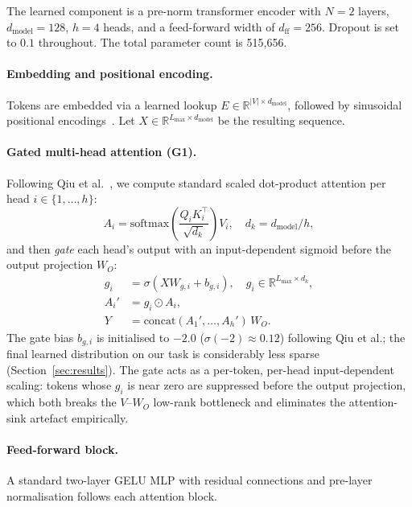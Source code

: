 The learned component is a pre-norm transformer encoder with
$N=2$ layers, $d_{\text{model}}=128$, $h=4$ heads, and a
feed-forward width of $d_{\text{ff}}=256$. Dropout is set to $0.1$
throughout. The total parameter count is 515{,}656.

\paragraph{Embedding and positional encoding.} Tokens are embedded
via a learned lookup $E \in \mathbb{R}^{|V|\times d_{\text{model}}}$,
followed by sinusoidal positional
encodings~\cite{vaswani2017attention}. Let $X \in
\mathbb{R}^{L_{\max}\times d_{\text{model}}}$ be the resulting
sequence.

\paragraph{Gated multi-head attention (G1).} Following
Qiu et al.~\cite{qiu2025gated}, we compute standard scaled
dot-product attention per head $i\in\{1,\ldots,h\}$:
\begin{equation}
  A_i = \mathrm{softmax}\!\left(\frac{Q_i K_i^\top}{\sqrt{d_k}}\right) V_i,
  \quad d_k = d_{\text{model}}/h,
\end{equation}
and then \emph{gate} each head's output with an input-dependent
sigmoid before the output projection $W_O$:
\begin{align}
  g_i &= \sigma(X W_{g,i} + b_{g,i}),\quad g_i\in\mathbb{R}^{L_{\max}\times d_k},\\
  A_i' &= g_i \odot A_i,\\
  Y &= \mathrm{concat}(A_1',\ldots,A_h')\, W_O.
  \label{eq:g1}
\end{align}
The gate bias $b_{g,i}$ is initialised to $-2.0$
($\sigma(-2)\approx 0.12$) following Qiu et al.; the final learned
distribution on our task is considerably less sparse
(Section~\ref{sec:results}). The gate acts as a per-token,
per-head input-dependent scaling: tokens whose $g_i$ is near zero
are suppressed before the output projection, which both breaks the
$V$--$W_O$ low-rank bottleneck and eliminates the attention-sink
artefact empirically.

\paragraph{Feed-forward block.} A standard two-layer GELU MLP with
residual connections and pre-layer normalisation follows each
attention block.

